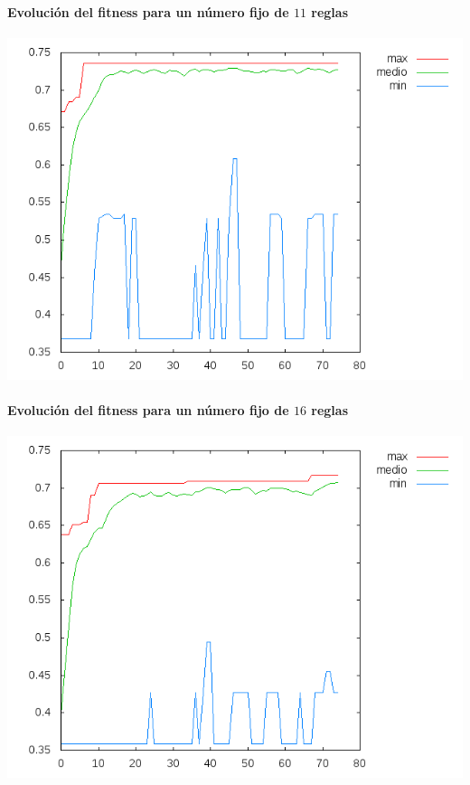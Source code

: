 \documentclass[nochap]{apuntes}
\begin{document}
\paragraph{Evolución del fitness para un número fijo de $11$ reglas}
\begin{center}
\includegraphics[scale=0.5]{tex/img/g75_p75_MejoresPorPeores_SeleccionProporcionalAlFitness_reg11.png}
\end{center}
\paragraph{Evolución del fitness para un número fijo de $16$ reglas}
\begin{center}
\includegraphics[scale=0.5]{tex/img/g75_p75_MejoresPorPeores_SeleccionProporcionalAlFitness_reg16.png}
\end{center}
\end{document}

